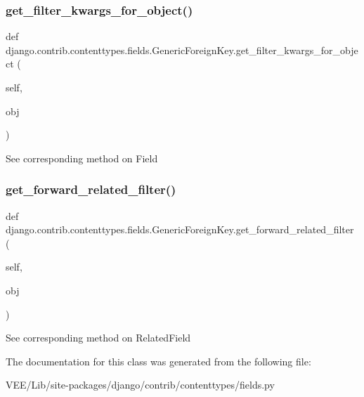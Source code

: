 \subsubsection{\texorpdfstring{get\+\_\+filter\+\_\+kwargs\+\_\+for\+\_\+object()}{get\_filter\_kwargs\_for\_object()}}
{\footnotesize\ttfamily def django.\+contrib.\+contenttypes.\+fields.\+Generic\+Foreign\+Key.\+get\+\_\+filter\+\_\+kwargs\+\_\+for\+\_\+object (\begin{DoxyParamCaption}\item[{}]{self,  }\item[{}]{obj }\end{DoxyParamCaption})}

\begin{DoxyVerb}See corresponding method on Field\end{DoxyVerb}
 \mbox{\label{classdjango_1_1contrib_1_1contenttypes_1_1fields_1_1_generic_foreign_key_a069c7e75f0ca299ecb544ee9d642d47a}} 
\subsubsection{\texorpdfstring{get\+\_\+forward\+\_\+related\+\_\+filter()}{get\_forward\_related\_filter()}}
{\footnotesize\ttfamily def django.\+contrib.\+contenttypes.\+fields.\+Generic\+Foreign\+Key.\+get\+\_\+forward\+\_\+related\+\_\+filter (\begin{DoxyParamCaption}\item[{}]{self,  }\item[{}]{obj }\end{DoxyParamCaption})}

\begin{DoxyVerb}See corresponding method on RelatedField\end{DoxyVerb}
 

The documentation for this class was generated from the following file\+:\begin{DoxyCompactItemize}
\item 
V\+E\+E/\+Lib/site-\/packages/django/contrib/contenttypes/fields.\+py\end{DoxyCompactItemize}
